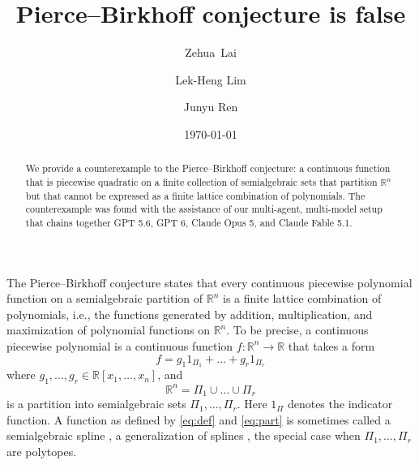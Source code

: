 \documentclass[11pt]{amsart}
\theoremstyle{remark}
\begin{document}
\title{Pierce--Birkhoff conjecture is false}
\author[Z.~Lai]{Zehua~Lai}
\address{Institute of Applied Mathematics, Academy of Mathematics and Systems Science, Chinese Academy of Sciences, Beijing 100190, China}
\author[L.-H.~Lim]{Lek-Heng Lim}
\author[J.~Ren]{Junyu Ren}
\address{Computational and Applied Mathematics Initiative, University of Chicago, Chicago, IL 60637}
\date{\today}

\begin{abstract}
We provide a counterexample to the Pierce--Birkhoff conjecture: a continuous function that is piecewise quadratic on a finite collection of semialgebraic sets that partition $\mathbb{R}^n$ but that cannot be expressed as a finite lattice combination of polynomials. 
The counterexample was found with the assistance of our multi-agent, multi-model setup that chains together GPT 5.6, GPT 6, Claude Opus 5, and Claude Fable 5.1.
\end{abstract}

\maketitle


The Pierce--Birkhoff conjecture states that every continuous piecewise polynomial function on a semialgebraic partition of $\mathbb{R}^n$ is a finite lattice combination of polynomials, i.e., the functions generated by addition, multiplication, and maximization of polynomial functions on $\mathbb{R}^n$. To be precise, a continuous piecewise polynomial is a continuous function $f : \mathbb{R}^n \to \mathbb{R}$ that takes a form
\begin{equation}\label{eq:def}
f = g_1 1_{\Pi_1} + \dots +  g_r 1_{\Pi_r}
\end{equation}
where $g_1,\dots,g_r \in \mathbb{R}[x_1,\dots,x_n]$, and
\begin{equation}\label{eq:part}
\mathbb{R}^n = \Pi_1 \cup \dots \cup \Pi_r
\end{equation}
is a partition into semialgebraic sets $\Pi_1,\dots,\Pi_r$. Here $1_{\Pi}$ denotes the indicator function. A function as defined by \eqref{eq:def} and \eqref{eq:part} is sometimes called a semialgebraic spline \cite{dipasquale2017}, a generalization of splines \cite{Chui}, the special case when $\Pi_1,\dots,\Pi_r$ are polytopes.
\end{document}
